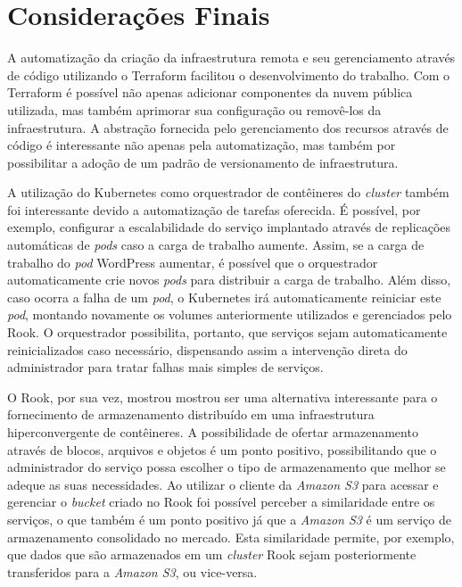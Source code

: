 
\chapter{Considerações Finais}
\label{c_consideracoes-finais}

A automatização da criação da infraestrutura remota e seu gerenciamento através de código utilizando o Terraform facilitou o desenvolvimento do trabalho. Com o Terraform é possível não apenas adicionar componentes da nuvem pública utilizada, mas também aprimorar sua configuração ou removê-los da infraestrutura. A abstração fornecida pelo gerenciamento dos recursos através de código é interessante não apenas pela automatização, mas também por possibilitar a adoção de um padrão de versionamento de infraestrutura.

A utilização do Kubernetes como orquestrador de contêineres do \textit{cluster} também foi interessante devido a automatização de tarefas oferecida. É possível, por exemplo, configurar a escalabilidade do serviço implantado através de replicações automáticas de \textit{pods} caso a carga de trabalho aumente. Assim, se a carga de trabalho do \textit{pod} WordPress aumentar, é possível que o orquestrador automaticamente crie novos \textit{pods} para distribuir a carga de trabalho. Além disso, caso ocorra a falha de um \textit{pod}, o Kubernetes irá automaticamente reiniciar este \textit{pod}, montando novamente os volumes anteriormente utilizados e gerenciados pelo Rook. O orquestrador possibilita, portanto, que serviços sejam automaticamente reinicializados caso necessário, dispensando assim a intervenção direta do administrador para tratar falhas mais simples de serviços.

O Rook, por sua vez, mostrou mostrou ser uma alternativa interessante para o fornecimento de armazenamento distribuído em uma infraestrutura hiperconvergente de contêineres. A possibilidade de ofertar armazenamento através de blocos, arquivos e objetos é um ponto positivo, possibilitando que o administrador do serviço possa escolher o tipo de armazenamento que melhor se adeque as suas necessidades. Ao utilizar o cliente da \textit{Amazon S3} para acessar e gerenciar o \textit{bucket} criado no Rook foi possível perceber a similaridade entre os serviços, o que também é um ponto positivo já que a \textit{Amazon S3} é um serviço de armazenamento consolidado no mercado. Esta similaridade permite, por exemplo, que dados que são armazenados em um \textit{cluster} Rook sejam posteriormente transferidos para a \textit{Amazon S3}, ou vice-versa.

